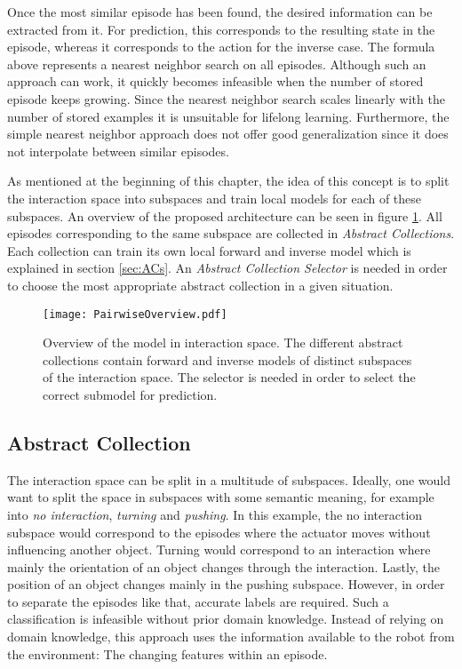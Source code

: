 Once the most similar episode has been found, the desired information can be extracted from it. For prediction, this corresponds to the resulting state in the episode, whereas it corresponds to the action for the inverse case. The formula above represents a nearest neighbor search on all episodes. Although such an approach can work, it quickly becomes infeasible when the number of stored episode keeps growing. Since the nearest neighbor search scales linearly with the number of stored examples it is unsuitable for lifelong learning. %
Furthermore, the simple nearest neighbor approach does not offer good generalization since it does not interpolate between similar episodes. 

As mentioned at the beginning of this chapter, the idea of this concept is to split the interaction space into subspaces and train local models for each of these subspaces. An overview of the proposed architecture can be seen in figure \ref{fig:PairOverview}.
All episodes corresponding to the same subspace are collected in \textit{Abstract Collections}. Each collection can train its own local forward and inverse model which is explained in section \ref{sec:ACs}.
An \textit{Abstract Collection Selector} is needed in order to choose the most appropriate abstract collection in a given situation. 


\begin{figure}
	\centering
	\texttt{[image: PairwiseOverview.pdf]}
	\caption{Overview of the model in interaction space. The different abstract collections contain forward and inverse models of distinct subspaces of the interaction space. The selector is needed in order to select the correct submodel for prediction.}%
	\label{fig:PairOverview}
\end{figure}

\subsection{Abstract Collection \label{sec:ACs}}

The interaction space can be split in a multitude of subspaces. Ideally, one would want to split the space in subspaces with some semantic meaning, for example into \textit{no interaction}, \textit{turning} and \textit{pushing}. In this example, the no interaction subspace would correspond to the episodes where the actuator moves without influencing another object. Turning would correspond to an interaction where mainly the orientation of an object changes through the interaction. Lastly, the position of an object changes mainly in the pushing subspace. However, in order to separate the episodes like that, accurate labels are required. Such a classification is infeasible without prior domain knowledge. 
Instead of relying on domain knowledge, this approach uses the information available to the robot from the environment: The changing features within an episode.

